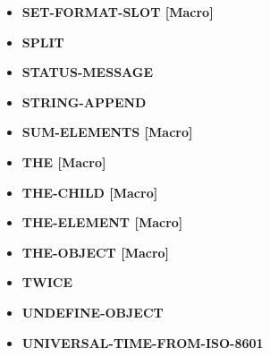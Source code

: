 \documentclass [11pt]{book}
\begin{document}
\begin{itemize}
\item {}
\textbf{SET-FORMAT-SLOT [Macro]}





\item {}
\textbf{SPLIT}





\item {}
\textbf{STATUS-MESSAGE}





\item {}
\textbf{STRING-APPEND}





\item {}
\textbf{SUM-ELEMENTS [Macro]}





\item {}
\textbf{THE [Macro]}





\item {}
\textbf{THE-CHILD [Macro]}





\item {}
\textbf{THE-ELEMENT [Macro]}





\item {}
\textbf{THE-OBJECT [Macro]}





\item {}
\textbf{TWICE}





\item {}
\textbf{UNDEFINE-OBJECT}





\item {}
\textbf{UNIVERSAL-TIME-FROM-ISO-8601}






\end{itemize}
\end{document}
